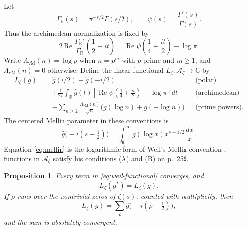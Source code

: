 \documentclass[11pt]{article}
\newtheorem{proposition}[theorem]{Proposition}
\theoremstyle{definition}
\theoremstyle{remark}
\numberwithin{equation}{section}
\newcommand{\cA}{\mathcal A}
\newcommand{\R}{\mathbb R}
\newcommand{\C}{\mathbb C}
\begin{document}
Let
\[
 \Gamma_{\R}(s)=\pi^{-s/2}\Gamma(s/2),
 \qquad \psi(s)=\frac{\Gamma'(s)}{\Gamma(s)}.
\]
Thus the archimedean normalization is fixed by
\begin{equation}
 2\operatorname{Re}\frac{\Gamma_{\R}'}{\Gamma_{\R}}
       \left(\frac12+it\right)
 =\operatorname{Re}\psi\left(\frac14+\frac{it}{2}\right)-\log\pi.
 \label{eq:gamma-normalization}
\end{equation}
Write $\Lambda_{\mathrm{vM}}(n)=\log p$ when $n=p^m$ with $p$ prime
and $m\geq1$, and $\Lambda_{\mathrm{vM}}(n)=0$ otherwise.  Define the
linear functional $L_\zeta:\cA_\zeta\to\C$ by
\begin{equation}
\begin{aligned}
 L_\zeta(g)={}&\widehat g(i/2)+\widehat g(-i/2)
                                      &&\text{(polar)}\\
 &+\frac1{2\pi}\int_{\R}\widehat g(t)
 \left[
   \operatorname{Re}\psi\left(\frac14+\frac{it}{2}\right)-\log\pi
 \right]dt                           &&\text{(archimedean)}\\
 &-\sum_{n\geq2}\frac{\Lambda_{\mathrm{vM}}(n)}{\sqrt n}
       \bigl(g(\log n)+g(-\log n)\bigr)
                                      &&\text{(prime powers)}.
\end{aligned}
\label{eq:weil-functional}
\end{equation}
The centered Mellin parameter in these conventions is
\begin{equation}
 \widehat g\bigl(-i(s-\tfrac12)\bigr)
 =\int_0^\infty g(\log x)x^{s-1/2}\,\frac{dx}{x}.
 \label{eq:mellin}
\end{equation}
Equation \eqref{eq:mellin} is the logarithmic form of Weil's Mellin
convention \cite[p.~256]{Weil1952}; functions in $\cA_\zeta$ satisfy his
conditions (A) and (B) on p.~259.

\begin{proposition}
Every term in \eqref{eq:weil-functional} converges, and
\begin{equation}
 L_\zeta(g^*)=\overline{L_\zeta(g)}.
 \label{eq:hermitian}
\end{equation}
If $\rho$ runs over the nontrivial zeros of $\zeta(s)$, counted with
multiplicity, then
\begin{equation}
 L_\zeta(g)=\sum_\rho
 \widehat g\bigl(-i(\rho-\tfrac12)\bigr),
 \label{eq:explicit}
\end{equation}
and the sum is absolutely convergent.
\end{proposition}
\end{document}
